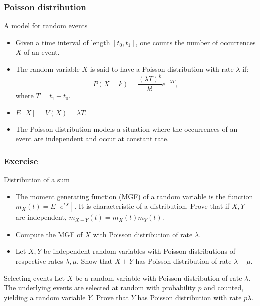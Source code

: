 \begin{frame}
    \frametitle{Poisson distribution}
\begin{block}{A model for random events}
   \begin{itemize}
    \item<+-> Given a time interval of length $\left[ t_0, t_1 \right]$, one counts the number of occurrences $X$ of an event.
    \item<+-> The random variable $X$ is said to have a Poisson distribution with rate $\lambda$ if:
    \begin{equation}
        P\left( X=k \right) = \frac{\left( \lambda T \right)^k}{k!} e^{-\lambda T},
    \end{equation}
    where $T=t_1-t_0.$
    \item<+-> $E\left[ X \right] = V(X)= \lambda T.$
    \item<+-> The Poisson distribution models a situation where the occurrences of an event are independent and occur at constant rate.
   \end{itemize} 

\end{block}
\end{frame}

\begin{frame}
    \frametitle{Exercise}
\begin{block}{Distribution of a sum}
    \begin{itemize}
        \item<+-> The moment generating function (MGF) of a random variable is the function $m_X(t)=E\left[ e^{tX} \right].$ It is
        characteristic of a distribution.  Prove that if $X,Y$ are independent, $m_{X+Y}(t)=m_X(t)m_Y(t).$
        \item<+-> Compute the MGF of $X$ with Poisson distribution of rate $\lambda.$
        \item<+-> Let $X,Y$ be independent random variables with Poisson distributions of respective rates $\lambda,\mu.$ 
        Show that $X+Y$ has Poisson distribution of rate $\lambda+\mu.$
    \end{itemize}
\end{block}
\begin{block}{Selecting events}
    Let $X$ be a random variable with Poisson distribution of rate $\lambda$. The underlying events are selected at random
    with probability $p$ and counted, yielding a random variable $Y$. Prove that $Y$ has Poisson distribution with rate $p \lambda.$
\end{block}    

\end{frame}

